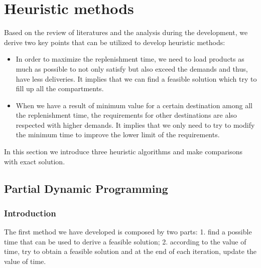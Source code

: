 \documentclass{article}
\begin{document}
\section{Heuristic methods}
\label{sec:heu}
Based on the review of literatures and the analysis during the development, we derive two key points that can be utilized to develop heuristic methods:
\begin{itemize}
\item In order to maximize the replenishment time, we need to load products as much as possible to not only satisfy but also exceed the demands and thus, have less deliveries. It implies that we can find a feasible solution which try to fill up all the compartments.
\item When we have a result of minimum value for a certain destination among all the replenishment time, the requirements for other destinations are also respected with higher demands. It implies that we only need to try to modify the minimum time to improve the lower limit of the requirements.
\end{itemize}

In this section we introduce three heuristic algorithms and make comparisons with exact solution.

\subsection{Partial Dynamic Programming}
\subsubsection{Introduction}
The first method we have developed is composed by two parts: 1. find a possible time that can be used to derive a feasible solution; 2. according to the value of time, try to obtain a feasible solution and at the end of each iteration, update the value of time.
\end{document}
